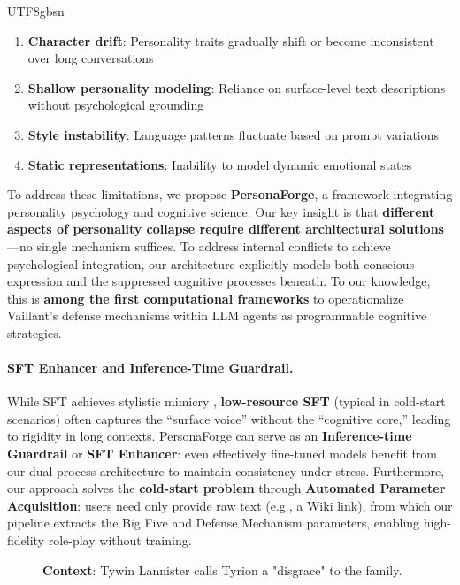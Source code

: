 \documentclass[11pt]{article}
\begin{document}
\begin{CJK*}{UTF8}{gbsn}
\begin{enumerate}
    \item \textbf{Character drift}: Personality traits gradually shift or become inconsistent over long conversations
    \item \textbf{Shallow personality modeling}: Reliance on surface-level text descriptions without psychological grounding
    \item \textbf{Style instability}: Language patterns fluctuate based on prompt variations
    \item \textbf{Static representations}: Inability to model dynamic emotional states
\end{enumerate}

To address these limitations, we propose \textbf{PersonaForge}, a framework integrating personality psychology and cognitive science. Our key insight is that \textbf{different aspects of personality collapse require different architectural solutions}---no single mechanism suffices. To address internal conflicts to achieve psychological integration, our architecture explicitly models both conscious expression and the suppressed cognitive processes beneath. To our knowledge, this is \textbf{among the first computational frameworks} to operationalize Vaillant's defense mechanisms within LLM agents as programmable cognitive strategies.

\paragraph{SFT Enhancer and Inference-Time Guardrail.} While SFT achieves stylistic mimicry \citep{shao2023character}, \textbf{low-resource SFT} (typical in cold-start scenarios) often captures the ``surface voice'' without the ``cognitive core,'' leading to rigidity in long contexts. PersonaForge can serve as an \textbf{Inference-time Guardrail} or \textbf{SFT Enhancer}: even effectively fine-tuned models benefit from our dual-process architecture to maintain consistency under stress. Furthermore, our approach solves the \textbf{cold-start problem} through \textbf{Automated Parameter Acquisition}: users need only provide raw text (e.g., a Wiki link), from which our pipeline extracts the Big Five and Defense Mechanism parameters, enabling high-fidelity role-play without training.

\begin{figure}[t]
\centering
\begin{tcolorbox}[colback=gray!10, colframe=black!70, title=\textbf{Case Study: Psychological Defense Mechanism (Tyrion Lannister)}]
\small
\textbf{Context}: Tywin Lannister calls Tyrion a "disgrace" to the family.


\end{tcolorbox}
\end{figure}
\end{CJK*}
\end{document}
